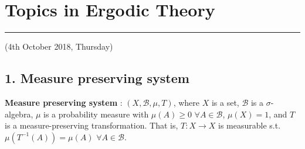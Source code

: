 \documentclass[12pt,a4paper]{report}
\DeclarePairedDelimiter\bignorm{\lVert}{\rVert}
\newcommand{\doublerule}[1][.4pt]{%
  \noindent
  \makebox[0pt][l]{\rule[.7ex]{\linewidth}{#1}}%
  \rule[.3ex]{\linewidth}{#1}}
\begin{document}
\newcommand{\thm}{\textbf{Theorem) }}
\newcommand{\thmnum}[1]{\textbf{Theorem #1) }}
\newcommand{\defi}{\textbf{Definition) }}
\newcommand{\lem}{\textbf{Lemma) }}
\newcommand{\lemnum}[1]{\textbf{Lemma #1) }}
\newcommand{\prop}{\textbf{Proposition) }}
\newcommand{\pf}{\textbf{proof) }}
\newcommand{\cor}{\textbf{Corollary) }}
\newcommand{\cornum}[1]{\textbf{Corollary #1) }}

\newcommand{\lap}{\triangle} %
\newcommand{\s}{\vspace{10pt}}
\newcommand{\bull}{$\bullet$}
\newcommand{\sta}{$\star$}
\newcommand{\reals}{\mathbb{R}}

\newcommand{\eop}{\hfill  \textsl{(End of proof)} $\square$} %

\newcommand{\intN}{\mathbb{Z}_N}
\newcommand{\norms}[2]{\bignorm[\big]{#1}_{#2}}
\newcommand{\abs}[1]{\big| #1 \big|}
\newcommand{\avg}{\mathbb{E}}
\newcommand{\borel}{\mathscr{B}}
\newcommand{\setlimsup}[2]{\bigcap_{#1=1}^{\infty}\bigcup_{#2=#1}^{\infty}}
\newcommand{\dlim}{D-\lim}
\newcommand{\clim}{C-\lim}

\newcommand{\ndiv}{\hspace{-5pt}\not|\hspace{3pt}}

\newcommand{\newday}{\doublerule[0.5pt]}
\newcommand{\digression}{**********************************************************************************************}

\setlength\parindent{0pt}
\noindent

\chapter*{Topics in Ergodic Theory}
\s

\newday

(4th October 2018, Thursday)
\s

\section*{1. Measure preserving system}

\textbf{Measure preserving system} : $(X, \borel, \mu, T)$, where $X$ is a set, $\borel$ is a $\sigma$-algebra, $\mu$ is a probability measure with $\mu(A) \geq 0$ $\forall A \in \borel$, $\mu(X)=1$, and $T$ is a measure-preserving transformation. That is, $T: X\rightarrow X$ is measurable s.t. $\mu(T^{-1}(A)) = \mu(A)$ $\forall A \in \borel$.
\s
\end{document}
